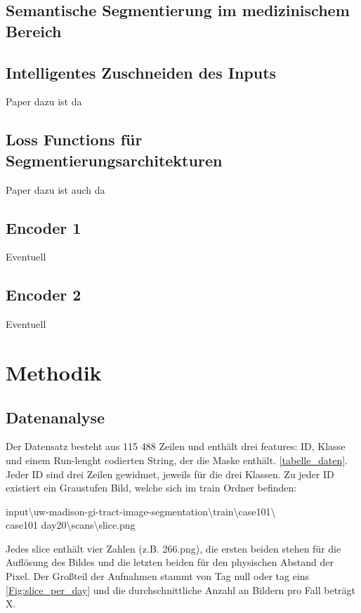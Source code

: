 \subsection{Semantische Segmentierung im medizinischem Bereich}

\subsection{Intelligentes Zuschneiden des Inputs}
Paper dazu ist da

\subsection{Loss Functions für Segmentierungsarchitekturen}
Paper dazu ist auch da

\subsection{Encoder 1}
Eventuell

\subsection{Encoder 2}
Eventuell

\section{Methodik}\raggedbottom

\subsection{Datenanalyse}
Der Datensatz besteht aus 115 488 Zeilen und enthält drei features: ID, Klasse und einem Run-lenght codierten String, der die Maske enthält. \autoref{tabelle_daten}. Jeder ID sind drei Zeilen gewidmet, jeweils für die drei Klassen. Zu jeder ID existiert ein Graustufen Bild, welche sich im train Ordner befinden: 

input\textbackslash uw-madison-gi-tract-image-segmentation\textbackslash train\textbackslash case101\textbackslash \\case101\textunderscore 
day20\textbackslash scans\textbackslash slice.png

Jedes slice enthält vier Zahlen (z.B. 266.png), die ersten beiden stehen für die Auflösung des Bildes und die letzten beiden für den physischen Abstand der Pixel. Der Großteil der Aufnahmen stammt von Tag null oder tag eins \autoref{Fig:slice_per_day} und die durchschnittliche Anzahl an Bildern pro Fall beträgt X.

